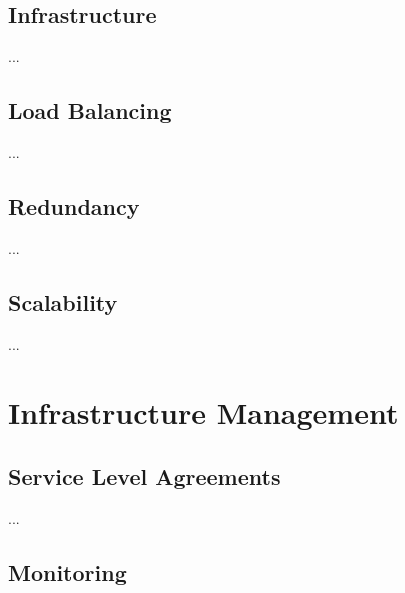 \documentclass[12pt]{article}
\begin{document}
\subsection{Infrastructure} \label{architecture.infrastructure} %


...

\subsection{Load Balancing} \label{architecture.loadbalancing} %


...

\subsection{Redundancy} \label{architecture.redundancy} %


...

\subsection{Scalability} \label{architecture.scalability} %


...

\newpage
\section{Infrastructure Management} \label{management} %

\subsection{Service Level Agreements} \label{management.sla} %


...

\subsection{Monitoring} \label{management.monitoring} %
\end{document}
